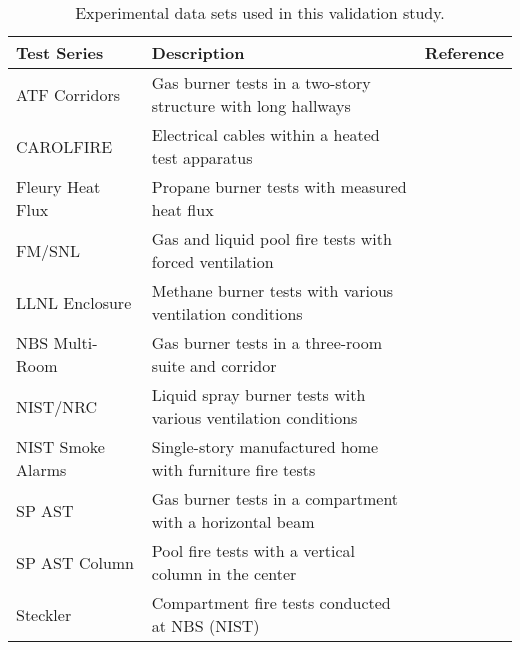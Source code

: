 \begin{table}[!ht]
\caption[Experimental data sets used in this validation study]
{Experimental data sets used in this validation study.}

\begin{center}
\begin{tabular}{|l|l|c|}
\hline
Test Series           &  Description                                                        &  Reference                                  \\ \hline \hline
ATF Corridors         &  Gas burner tests in a two-story structure with long hallways       &  \cite{Sheppard:Corridors}                  \\ \hline
CAROLFIRE             &  Electrical cables within a heated test apparatus                   &  \cite{CAROLFIRE}                           \\ \hline
Fleury Heat Flux      &  Propane burner tests with measured heat flux                       &  \cite{Fleury:Masters}                      \\ \hline
FM/SNL                &  Gas and liquid pool fire tests with forced ventilation             &  \cite{Nowlen:NUREG4681, Nowlen:NUREG4527}  \\ \hline
LLNL Enclosure        &  Methane burner tests with various ventilation conditions           &  \cite{Foote:LLNL1986}                      \\ \hline
NBS Multi-Room        &  Gas burner tests in a three-room suite and corridor                &  \cite{Peacock:NBS_Multi-Room}              \\ \hline
NIST/NRC              &  Liquid spray burner tests with various ventilation conditions      &  \cite{Hamins:SP1013-1}                     \\ \hline
NIST Smoke Alarms     &  Single-story manufactured home with furniture fire tests           &  \cite{Bukowski:1}                          \\ \hline
SP AST                &  Gas burner tests in a compartment with a horizontal beam           &  \cite{Wickstrom_AST}                       \\ \hline
SP AST Column         &  Pool fire tests with a vertical column in the center               &  \cite{Sjostrom:AST}                        \\ \hline
Steckler              &  Compartment fire tests conducted at NBS (NIST)                     &  \cite{Steckler:NBSIR_82-2520}              \\ \hline

\end{tabular}
\end{center}
\end{table}

